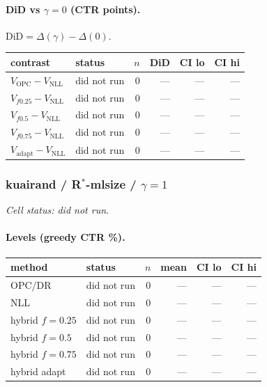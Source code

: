 \documentclass[10pt,a4paper]{article}
\begin{document}
\paragraph{DiD vs $\gamma=0$ (CTR points).} $\mathrm{DiD}=\Delta(\gamma)-\Delta(0)$.
{\centering\small\begin{tabular}{llrrrr}
\toprule contrast & status & $n$ & DiD & CI lo & CI hi \\
\midrule
$V_{\mathrm{OPC}}-V_{\mathrm{NLL}}$ & did not run & 0 & --- & --- & --- \\
$V_{f0.25}-V_{\mathrm{NLL}}$ & did not run & 0 & --- & --- & --- \\
$V_{f0.5}-V_{\mathrm{NLL}}$ & did not run & 0 & --- & --- & --- \\
$V_{f0.75}-V_{\mathrm{NLL}}$ & did not run & 0 & --- & --- & --- \\
$V_{\mathrm{adapt}}-V_{\mathrm{NLL}}$ & did not run & 0 & --- & --- & --- \\
\bottomrule\end{tabular}\par}
\bigskip
\subsubsection{kuairand / R$^*$-mlsize / $\gamma=1$}
\emph{Cell status: did not run}.
\paragraph{Levels (greedy CTR \%).}
{\centering\small\begin{tabular}{llrrrr}
\toprule method & status & $n$ & mean & CI lo & CI hi \\
\midrule
OPC/DR & did not run & 0 & --- & --- & --- \\
NLL & did not run & 0 & --- & --- & --- \\
hybrid $f{=}0.25$ & did not run & 0 & --- & --- & --- \\
hybrid $f{=}0.5$ & did not run & 0 & --- & --- & --- \\
hybrid $f{=}0.75$ & did not run & 0 & --- & --- & --- \\
hybrid adapt & did not run & 0 & --- & --- & --- \\
\bottomrule\end{tabular}\par}
\end{document}
